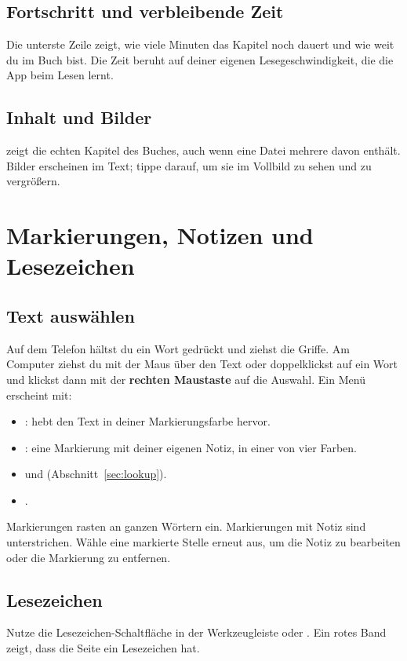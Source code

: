 \documentclass[11pt]{article}
\begin{document}
\subsection{Fortschritt und verbleibende Zeit}
Die unterste Zeile zeigt, wie viele Minuten das Kapitel noch dauert und wie weit du im Buch bist.
Die Zeit beruht auf deiner eigenen Lesegeschwindigkeit, die die App beim Lesen lernt.

\subsection{Inhalt und Bilder}
 zeigt die echten Kapitel des Buches, auch wenn eine Datei mehrere davon enthält. Bilder
erscheinen im Text; tippe darauf, um sie im Vollbild zu sehen und zu vergrößern.

\section{Markierungen, Notizen und Lesezeichen}

\subsection{Text auswählen}
Auf dem Telefon hältst du ein Wort gedrückt und ziehst die Griffe. Am Computer ziehst du mit der
Maus über den Text oder doppelklickst auf ein Wort und klickst dann mit der \textbf{rechten
Maustaste} auf die Auswahl. Ein Menü erscheint mit:
\begin{itemize}
  \item {}: hebt den Text in deiner Markierungsfarbe hervor.
  \item {}: eine Markierung mit deiner eigenen Notiz, in einer von vier Farben.
  \item {} und  (Abschnitt~\ref{sec:lookup}).
  \item {}.
\end{itemize}
Markierungen rasten an ganzen Wörtern ein. Markierungen mit Notiz sind unterstrichen. Wähle eine
markierte Stelle erneut aus, um die Notiz zu bearbeiten oder die Markierung zu entfernen.

\subsection{Lesezeichen}
Nutze die Lesezeichen-Schaltfläche in der Werkzeugleiste oder . Ein rotes Band zeigt,
dass die Seite ein Lesezeichen hat.
\end{document}
